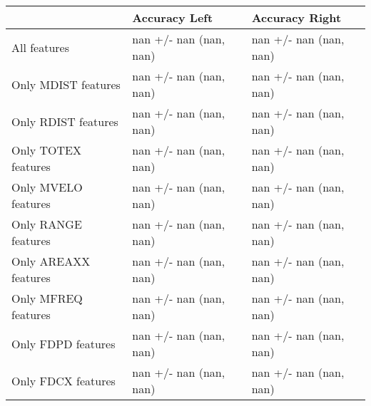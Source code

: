 \begin{tabular}{lll}
\toprule
{} &           Accuracy Left &          Accuracy Right \\
\midrule
All features         &  nan +/- nan (nan, nan) &  nan +/- nan (nan, nan) \\
Only MDIST features  &  nan +/- nan (nan, nan) &  nan +/- nan (nan, nan) \\
Only RDIST features  &  nan +/- nan (nan, nan) &  nan +/- nan (nan, nan) \\
Only TOTEX features  &  nan +/- nan (nan, nan) &  nan +/- nan (nan, nan) \\
Only MVELO features  &  nan +/- nan (nan, nan) &  nan +/- nan (nan, nan) \\
Only RANGE features  &  nan +/- nan (nan, nan) &  nan +/- nan (nan, nan) \\
Only AREAXX features &  nan +/- nan (nan, nan) &  nan +/- nan (nan, nan) \\
Only MFREQ features  &  nan +/- nan (nan, nan) &  nan +/- nan (nan, nan) \\
Only FDPD features   &  nan +/- nan (nan, nan) &  nan +/- nan (nan, nan) \\
Only FDCX features   &  nan +/- nan (nan, nan) &  nan +/- nan (nan, nan) \\
\bottomrule
\end{tabular}
